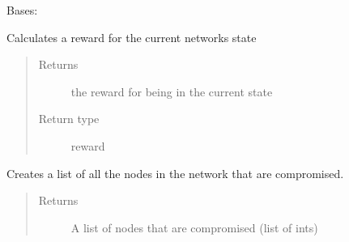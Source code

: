 \documentclass[letterpaper,10pt,english]{sphinxmanual}
\begin{document}
\begin{fulllineitems}
\label{\detokenize{source/yawning_titan.envs.specific.core:yawning_titan.envs.specific.core.nsa_node_collection.NodeCollection}}
\sphinxAtStartPar
Bases: 

\begin{fulllineitems}
\label{\detokenize{source/yawning_titan.envs.specific.core:yawning_titan.envs.specific.core.nsa_node_collection.NodeCollection.calculate_reward}}
\sphinxAtStartPar
Calculates a reward for the current networks state
\begin{quote}\begin{description}
\item[{Returns}] \leavevmode
\sphinxAtStartPar
the reward for being in the current state

\item[{Return type}] \leavevmode
\sphinxAtStartPar
reward

\end{description}\end{quote}

\end{fulllineitems}


\begin{fulllineitems}
\label{\detokenize{source/yawning_titan.envs.specific.core:yawning_titan.envs.specific.core.nsa_node_collection.NodeCollection.get_compromised_nodes}}
\sphinxAtStartPar
Creates a list of all the nodes in the network that are compromised.
\begin{quote}\begin{description}
\item[{Returns}] \leavevmode
\sphinxAtStartPar
A list of nodes that are compromised (list of ints)


\end{description}
\end{quote}
\end{fulllineitems}
\end{fulllineitems}
\end{document}
